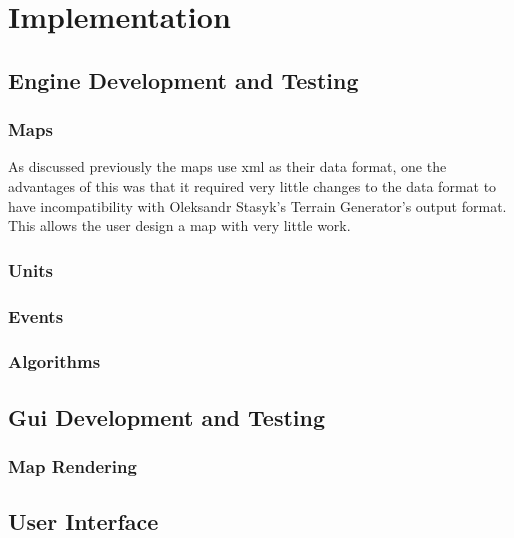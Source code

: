 
\section{Implementation}

\subsection{Engine Development and Testing}
\label{sub:engine_development_and_testing}

\subsubsection{Maps}
\label{ssub:maps}

As discussed previously the maps use xml as their data format, one the advantages of this was that it required very little changes to the data  format to have incompatibility with Oleksandr Stasyk's  Terrain Generator's output format.  This allows the user design a map with very little work. 

\subsubsection{Units}
\label{ssub:units}

\subsubsection{Events}
\label{ssub:events}

\subsubsection{Algorithms}
\label{ssub:Algorithms}


\subsection{Gui Development and Testing}

\subsubsection{Map Rendering}
\label{ssub:map_rendering}

\subsection{User Interface}


